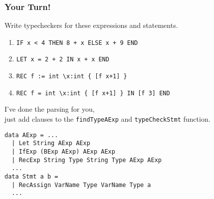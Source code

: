 \documentclass{beamer}
\begin{document}
\begin{frame}[fragile]
\frametitle{Your Turn!}
Write typecheckers for these expressions and statements.
\begin{enumerate}
\item
\begin{verbatim}
IF x < 4 THEN 8 + x ELSE x + 9 END
\end{verbatim}
\item
\begin{verbatim}
LET x = 2 + 2 IN x + x END
\end{verbatim}
\item
\begin{verbatim}
REC f := int \x:int { [f x+1] }
\end{verbatim}
\item
\begin{verbatim}
REC f = int \x:int { [f x+1] } IN [f 3] END
\end{verbatim}
\end{enumerate}

I've done the parsing for you, \\just add clauses  to the
{\tt findTypeAExp} and {\tt typeCheckStmt} function.
\begin{verbatim}
data AExp = ...
  | Let String AExp AExp 
  | IfExp (BExp AExp) AExp AExp  
  | RecExp String Type String Type AExp AExp 
  ...
data Stmt a b = 
  | RecAssign VarName Type VarName Type a
  ...
\end{verbatim}
\end{frame}
\end{document}
